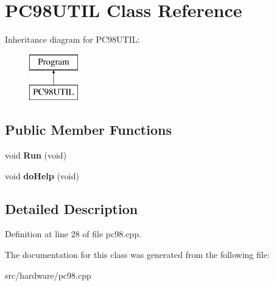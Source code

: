 \hypertarget{classPC98UTIL}{\section{P\-C98\-U\-T\-I\-L Class Reference}
\label{classPC98UTIL}
}
Inheritance diagram for P\-C98\-U\-T\-I\-L\-:\begin{figure}[H]
\begin{center}
\leavevmode
\includegraphics[height=2.000000cm]{classPC98UTIL}
\end{center}
\end{figure}
\subsection*{Public Member Functions}
\begin{DoxyCompactItemize}
\item 
\hypertarget{classPC98UTIL_a707ed1ec88edc877739dc492b9b2d752}{void {\bfseries Run} (void)}\label{classPC98UTIL_a707ed1ec88edc877739dc492b9b2d752}

\item 
\hypertarget{classPC98UTIL_acfb7033342820a8d47b88310b7c4a27d}{void {\bfseries do\-Help} (void)}\label{classPC98UTIL_acfb7033342820a8d47b88310b7c4a27d}

\end{DoxyCompactItemize}


\subsection{Detailed Description}


Definition at line 28 of file pc98.\-cpp.



The documentation for this class was generated from the following file\-:\begin{DoxyCompactItemize}
\item 
src/hardware/pc98.\-cpp\end{DoxyCompactItemize}
